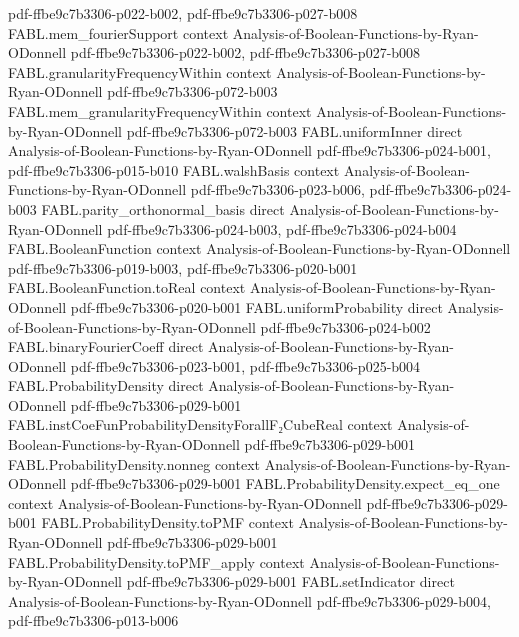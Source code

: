 \begin{theorem}
  {pdf-ffbe9c7b3306-p022-b002,
    pdf-ffbe9c7b3306-p027-b008}
\proofstep
  {FABL.mem_fourierSupport}
  {context}
  {Analysis-of-Boolean-Functions-by-Ryan-ODonnell}
  {pdf-ffbe9c7b3306-p022-b002,
    pdf-ffbe9c7b3306-p027-b008}
\proofstep
  {FABL.granularityFrequencyWithin}
  {context}
  {Analysis-of-Boolean-Functions-by-Ryan-ODonnell}
  {pdf-ffbe9c7b3306-p072-b003}
\proofstep
  {FABL.mem_granularityFrequencyWithin}
  {context}
  {Analysis-of-Boolean-Functions-by-Ryan-ODonnell}
  {pdf-ffbe9c7b3306-p072-b003}
\proofstep
  {FABL.uniformInner}
  {direct}
  {Analysis-of-Boolean-Functions-by-Ryan-ODonnell}
  {pdf-ffbe9c7b3306-p024-b001,
    pdf-ffbe9c7b3306-p015-b010}
\proofstep
  {FABL.walshBasis}
  {context}
  {Analysis-of-Boolean-Functions-by-Ryan-ODonnell}
  {pdf-ffbe9c7b3306-p023-b006,
    pdf-ffbe9c7b3306-p024-b003}
\proofstep
  {FABL.parity_orthonormal_basis}
  {direct}
  {Analysis-of-Boolean-Functions-by-Ryan-ODonnell}
  {pdf-ffbe9c7b3306-p024-b003,
    pdf-ffbe9c7b3306-p024-b004}
\proofstep
  {FABL.BooleanFunction}
  {context}
  {Analysis-of-Boolean-Functions-by-Ryan-ODonnell}
  {pdf-ffbe9c7b3306-p019-b003,
    pdf-ffbe9c7b3306-p020-b001}
\proofstep
  {FABL.BooleanFunction.toReal}
  {context}
  {Analysis-of-Boolean-Functions-by-Ryan-ODonnell}
  {pdf-ffbe9c7b3306-p020-b001}
\proofstep
  {FABL.uniformProbability}
  {direct}
  {Analysis-of-Boolean-Functions-by-Ryan-ODonnell}
  {pdf-ffbe9c7b3306-p024-b002}
\proofstep
  {FABL.binaryFourierCoeff}
  {direct}
  {Analysis-of-Boolean-Functions-by-Ryan-ODonnell}
  {pdf-ffbe9c7b3306-p023-b001,
    pdf-ffbe9c7b3306-p025-b004}
\proofstep
  {FABL.ProbabilityDensity}
  {direct}
  {Analysis-of-Boolean-Functions-by-Ryan-ODonnell}
  {pdf-ffbe9c7b3306-p029-b001}
\proofstep
  {FABL.instCoeFunProbabilityDensityForallF₂CubeReal}
  {context}
  {Analysis-of-Boolean-Functions-by-Ryan-ODonnell}
  {pdf-ffbe9c7b3306-p029-b001}
\proofstep
  {FABL.ProbabilityDensity.nonneg}
  {context}
  {Analysis-of-Boolean-Functions-by-Ryan-ODonnell}
  {pdf-ffbe9c7b3306-p029-b001}
\proofstep
  {FABL.ProbabilityDensity.expect_eq_one}
  {context}
  {Analysis-of-Boolean-Functions-by-Ryan-ODonnell}
  {pdf-ffbe9c7b3306-p029-b001}
\proofstep
  {FABL.ProbabilityDensity.toPMF}
  {context}
  {Analysis-of-Boolean-Functions-by-Ryan-ODonnell}
  {pdf-ffbe9c7b3306-p029-b001}
\proofstep
  {FABL.ProbabilityDensity.toPMF_apply}
  {context}
  {Analysis-of-Boolean-Functions-by-Ryan-ODonnell}
  {pdf-ffbe9c7b3306-p029-b001}
\proofstep
  {FABL.setIndicator}
  {direct}
  {Analysis-of-Boolean-Functions-by-Ryan-ODonnell}
  {pdf-ffbe9c7b3306-p029-b004,
    pdf-ffbe9c7b3306-p013-b006}

\end{theorem}
